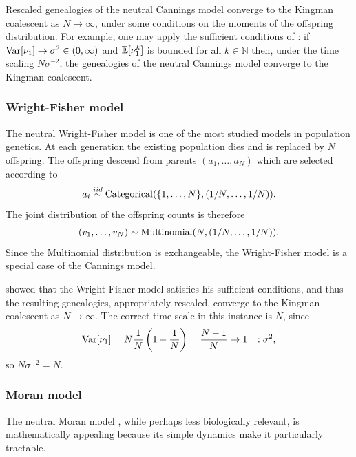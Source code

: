Rescaled genealogies of the neutral Cannings model converge to the Kingman coalescent as $N\to\infty$, under some conditions on the moments of the offspring distribution. 
For example, one may apply the sufficient conditions of \textcite{kingman1982gene}:
if $\operatorname{Var}[\nu_1] \to \sigma^2 \in (0,\infty)$ and $\mathbb{E}[\nu_1^k]$ is bounded for all $k\in\mathbb{N}$ then, under the time scaling $N\sigma^{-2}$, the genealogies of the neutral Cannings model converge to the Kingman coalescent.




\subsubsection{Wright-Fisher model}
The neutral Wright-Fisher model \parencite{fisher1923, fisher1930, wright1931} is one of the most studied models in population genetics.
At each generation the existing population dies and is replaced by $N$ offspring. The offspring descend from parents $(a_1, \dots, a_N)$ which are selected according to
\begin{equation*}
a_i \overset{iid}{\sim} \operatorname{Categorical}(\{1, \dots, N\}, (1/N, \dots, 1/N)).
\end{equation*}
The joint distribution of the offspring counts is therefore
\begin{equation*}
(v_1,\dots, v_N) \sim \operatorname{Multinomial}(N, (1/N, \dots, 1/N)).
\end{equation*}
Since the Multinomial distribution is exchangeable, the Wright-Fisher model is a special case of the Cannings model.

\textcite{kingman1982gene} showed that the Wright-Fisher model satisfies his sufficient conditions, and thus the resulting genealogies, appropriately rescaled, converge to the Kingman coalescent as $N\to\infty$.
The correct time scale in this instance is $N$, since
\begin{equation*}
\operatorname{Var}[\nu_1] = N\frac{1}{N} \left
(1 - \frac{1}{N}\right)
=\frac{N-1}{N}
\to 1 
=: \sigma^2 ,
\end{equation*}
so $N\sigma^{-2} = N$.



\subsubsection{Moran model}
The neutral Moran model \parencite{moran1958}, while perhaps less biologically relevant, is mathematically appealing because its simple dynamics make it particularly tractable.


